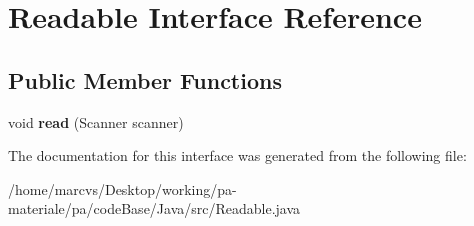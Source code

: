 \hypertarget{interfaceReadable}{
\section{Readable Interface Reference}
\label{interfaceReadable}
}
\subsection*{Public Member Functions}
\begin{DoxyCompactItemize}
\item 
\hypertarget{interfaceReadable_a4ff1529890f69b2ad321bc06e497ed16}{
void {\bfseries read} (Scanner scanner)}
\label{interfaceReadable_a4ff1529890f69b2ad321bc06e497ed16}

\end{DoxyCompactItemize}


The documentation for this interface was generated from the following file:\begin{DoxyCompactItemize}
\item 
/home/marcvs/Desktop/working/pa-\/materiale/pa/codeBase/Java/src/Readable.java\end{DoxyCompactItemize}
